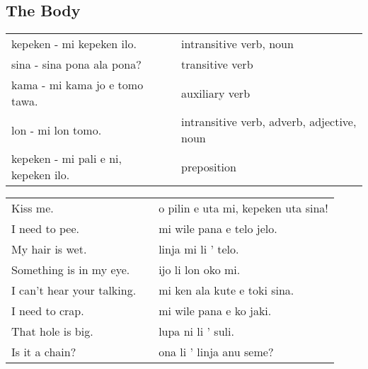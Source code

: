 \newpage
%
\subsection*{The Body} 
\label{'the_body'}
%

\begin{supertabular}{p{5,5cm}|ll}
kepeken - mi kepeken ilo. && intransitive verb, noun \\ %
sina - sina pona ala pona? && transitive verb \\ %
kama - mi kama jo e tomo tawa. && auxiliary verb \\ %
lon - mi lon tomo. && intransitive verb, adverb, adjective, noun \\ %
kepeken - mi pali e ni, kepeken ilo. && preposition \\ %
\end{supertabular}

\begin{supertabular}{p{5,5cm}|ll}
Kiss me.  && o pilin e uta mi, kepeken uta sina! \\ %
I need to pee.  && mi wile pana e telo jelo. \\ %
My hair is wet.  && linja mi li ' telo. \\ %
Something is in my eye.  && ijo li lon oko mi. \\ %
I can't hear your talking.  && mi ken ala kute e toki sina. \\ %
I need to crap.  && mi wile pana e ko jaki. \\ %
That hole is big.  && lupa ni li ' suli. \\ %
Is it a chain? && ona li ' linja anu seme? \\ %
\end{supertabular}  

